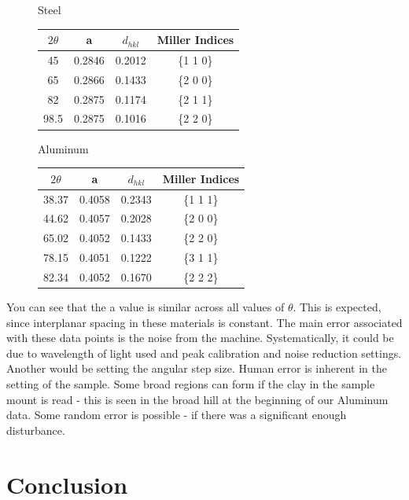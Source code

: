 \documentclass{article}
\begin{document}
\begin{figure}[h]
	\begin{minipage}{0.5\textwidth}
		\centering
		Steel
		
		\begin{tabular}{|| c | c | c | c ||}
		 \hline
		 $2\theta$ & a & $d_{hkl}$ & Miller Indices\\
		 \hline
		 \hline
		 45 & 0.2846 & 0.2012 & \{1 1 0\}\\
		 \hline
		 65 & 0.2866 & 0.1433 & \{2 0 0\}\\
		 \hline
		 82 & 0.2875 & 0.1174 & \{2 1 1\}\\
		 \hline
		 98.5 & 0.2875 & 0.1016 & \{2 2 0\}\\
		 \hline
		\end{tabular}
	\end{minipage}
	\begin{minipage}{0.5\textwidth}
		\centering
		Aluminum
		
		\begin{tabular}{|| c | c | c | c ||}
		 \hline
		 $2\theta$ & a & $d_{hkl}$ & Miller Indices\\
		 \hline
		 \hline
		 38.37 & 0.4058 & 0.2343 & \{1 1 1\}\\
		 \hline
		 44.62 & 0.4057 & 0.2028 & \{2 0 0\}\\
		 \hline
		 65.02 & 0.4052 & 0.1433 & \{2 2 0\}\\
		 \hline
		 78.15 & 0.4051 & 0.1222 & \{3 1 1\}\\
		 \hline
		 82.34 & 0.4052 & 0.1670 & \{2 2 2\}\\
		 \hline
		\end{tabular}
	\end{minipage}
\end{figure}

You can see that the a value is similar across all values of $\theta$. This is expected, since interplanar spacing in these materials is constant. The main error associated with these data points is the noise from the machine. Systematically, it could be due to wavelength of light used and peak calibration and noise reduction settings. Another would be setting the angular step size. Human error is inherent in the setting of the sample. Some broad regions can form if the clay in the sample mount is read - this is seen in the broad hill at the beginning of our Aluminum data. Some random error is possible - if there was a significant enough disturbance.

\section{Conclusion}
\end{document}
